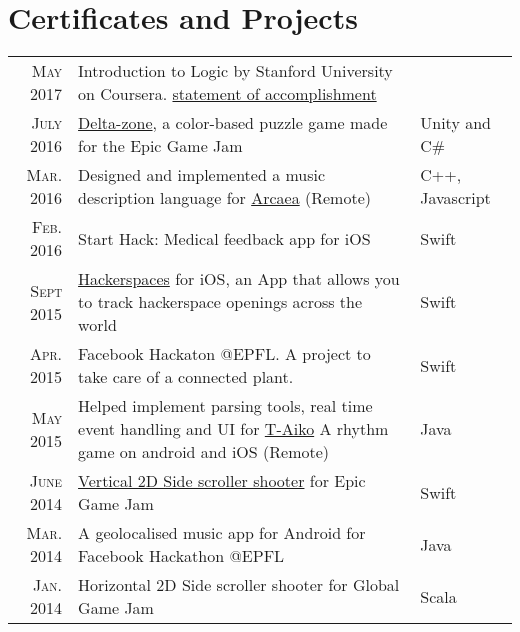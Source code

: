 \documentclass[a4paper,10pt]{article} %
\begin{document}

\section{Certificates and Projects}
\renewcommand{\arraystretch}{1.5}
\begin{tabular}{rp{10cm}|l}
\textsc{May} 2017 & Introduction to Logic by Stanford University on Coursera. \footnotesize{\href{https://www.coursera.org/account/accomplishments/certificate/RPGEPLA94HFF}{statement of accomplishment}}\\

\textsc{July} 2016 & \href{http://epicgamejam.com/game/delta-zone}{Delta-zone}, a color-based puzzle game made for the Epic Game Jam & Unity and C\#\\
\textsc{Mar.} 2016 & Designed and implemented a music description language for \href{https://arcaea.lowiro.com}{Arcaea} (Remote) & C++, Javascript\\
\textsc{Feb.} 2016 & Start Hack: Medical feedback app for iOS & Swift\\
\textsc{Sept} 2015 & \href{https://itunes.apple.com/us/app/hackerspaces/id1035583993?ls=1&mt=8}{Hackerspaces} for iOS, an App that allows you to track hackerspace openings across the world & Swift\\
\textsc{Apr.} 2015 & Facebook Hackaton @EPFL. A project to take care of a connected plant. & Swift\\
\textsc{May} 2015 & Helped implement parsing tools, real time event handling and UI for \href{https://play.google.com/store/apps/details?id=guy.taiko}{T-Aiko} A rhythm game on android and iOS (Remote) & Java\\
\textsc{June} 2014 & \href{http://epicgamejam.com/game/the-sole-saviour}{Vertical 2D Side scroller shooter} for Epic Game Jam & Swift\\
\textsc{Mar.} 2014 & A geolocalised music app for Android for Facebook Hackathon @EPFL & Java\\
\textsc{Jan.} 2014 & Horizontal 2D Side scroller shooter for Global Game Jam & Scala\\
\end{tabular}
\renewcommand{\arraystretch}{1.2}

\end{document}
